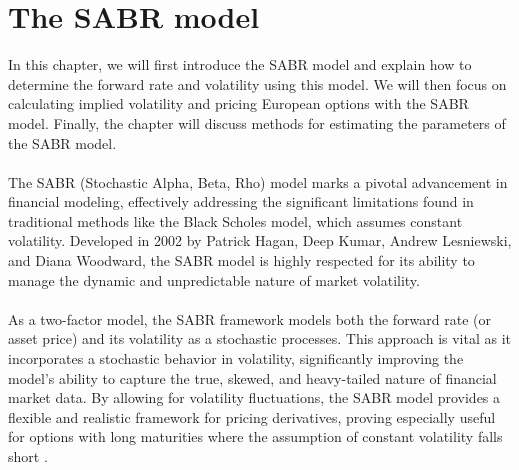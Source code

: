 \section{ The SABR model} \label{SABR_model}
In this chapter, we will first introduce the SABR model
 and explain how to determine the forward rate and 
 volatility using this model. We will then focus on 
 calculating implied volatility and pricing European 
 options with the SABR model. Finally, the chapter 
 will discuss methods for estimating the parameters 
 of the SABR model.
\\\\
The SABR (Stochastic Alpha, Beta, Rho) model marks a pivotal advancement 
in financial modeling, effectively addressing the significant limitations 
found in traditional methods like the Black Scholes model, which assumes 
constant volatility. Developed in 2002 by Patrick Hagan, Deep Kumar, 
Andrew Lesniewski, and Diana Woodward, the SABR model is highly respected for 
its ability to manage the dynamic and unpredictable nature of market 
volatility.
\\\\
As a two-factor model, the SABR framework models both the forward rate 
(or asset price) and its volatility as a stochastic processes. This approach 
is vital as it incorporates a stochastic behavior in volatility, significantly 
improving the model's ability to capture the true, skewed, and heavy-tailed 
nature of financial market data. By allowing for volatility fluctuations, 
the SABR model provides a flexible and realistic framework for pricing 
derivatives, proving especially useful for options with long maturities where 
the assumption of constant volatility falls short \cite{Smile}.
